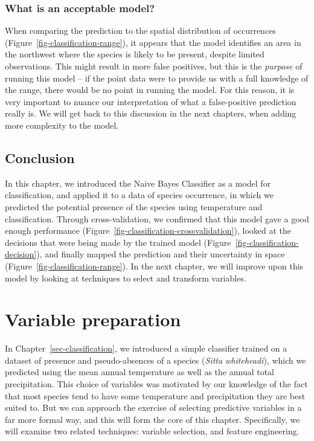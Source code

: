 \documentclass[
  letterpaper,
]{scrbook}
\begin{document}
\subsection{What is an acceptable
model?}\label{what-is-an-acceptable-model}

When comparing the prediction to the spatial distribution of occurrences
(Figure~\ref{fig-classification-range}), it appears that the model
identifies an area in the northwest where the species is likely to be
present, despite limited observations. This might result in more false
positives, but this is the \emph{purpose} of running this model -- if
the point data were to provide us with a full knowledge of the range,
there would be no point in running the model. For this reason, it is
very important to nuance our interpretation of what a false-positive
prediction really is. We will get back to this discussion in the next
chapters, when adding more complexity to the model.

\section{Conclusion}\label{conclusion-3}

In this chapter, we introduced the Naive Bayes Classifier as a model for
classification, and applied it to a data of species occurrence, in which
we predicted the potential presence of the species using temperature and
classification. Through cross-validation, we confirmed that this model
gave a good enough performance
(Figure~\ref{fig-classification-crossvalidation}), looked at the
decisions that were being made by the trained model
(Figure~\ref{fig-classification-decision}), and finally mapped the
prediction and their uncertainty in space
(Figure~\ref{fig-classification-range}). In the next chapter, we will
improve upon this model by looking at techniques to select and transform
variables.


\chapter{Variable preparation}\label{sec-predictors}

In Chapter~\ref{sec-classification}, we introduced a simple classifier
trained on a dataset of presence and pseudo-absences of a species
(\emph{Sitta whiteheadi}), which we predicted using the mean annual
temperature as well as the annual total precipitation. This choice of
variables was motivated by our knowledge of the fact that most species
tend to have some temperature and precipitation they are best suited to.
But we can approach the exercise of selecting predictive variables in a
far more formal way, and this will form the core of this chapter.
Specifically, we will examine two related techniques: variable
selection, and feature engineering.
\end{document}

